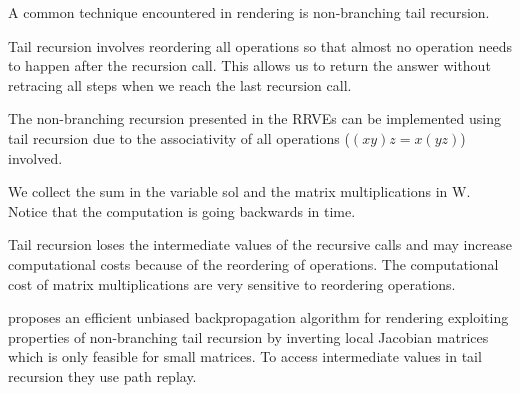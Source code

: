 \documentclass[a4paper,12pt]{article}
\begin{document}
A common technique encountered in rendering is non-branching tail recursion.

\begin{technique}
  Tail recursion involves reordering all operations
  so that almost no operation needs to happen after
  the recursion call. This allows us to return the
  answer without retracing all steps when we reach
  the last recursion call.
\end{technique}

The non-branching recursion presented in the RRVEs can
be implemented using tail recursion due to the associativity
of all operations ($(xy)z = x(yz)$) involved.



\begin{julia}
  We collect the sum in the variable sol and the matrix multiplications in W.
  Notice that the computation is going backwards in time.

\end{julia}

Tail recursion loses the intermediate values
of the recursive calls and
may increase computational costs because of the reordering of operations.
The computational cost of matrix multiplications are very sensitive
to reordering operations.

\begin{related}[non-branching tail recursion]
  \cite{vicini_path_2021} proposes an efficient unbiased backpropagation
  algorithm for rendering exploiting properties of non-branching tail recursion
  by inverting local Jacobian matrices which is only feasible for small matrices.
  To access intermediate values in tail recursion they use path replay.
\end{related}
\end{document}

